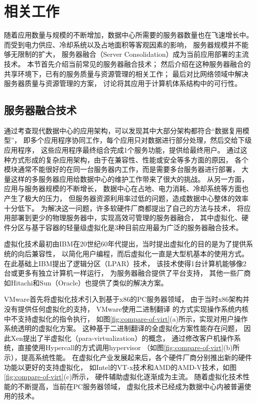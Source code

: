 

\chapter{相关工作}
\label{chap:background}

随着应用数量与规模的不断增加，数据中心所需要的服务器数量也在飞速增长中。
而受到电力供应、冷却系统以及占地面积等客观因素的影响，
服务器规模并不能够无限制的扩大，
服务器融合（Server Consolidation）成为当前应用部署的主流技术。
本节首先介绍当前常见的服务器融合技术；%
然后介绍在这种服务器融合的共享环境下，已有的服务质量与资源管理的相关工作；
最后对比网络领域中解决服务器质量与资源管理的方案，
讨论将其应用于计算机体系结构中的可行性。

\section{服务器融合技术}

通过考查现代数据中心的应用架构，可以发现其中大部分架构都符合``数据复用模型''，
即多个应用程序协同工作，每个应用只对数据进行部分处理，然后交给下级应用程序，
这些应用程序最终组合完成1个服务功能，提供给最终用户。
通过这种方式形成的复杂应用架构，由于在兼容性、性能或安全等多方面的原因，
各个模块通常不能很好的在同一台服务器内工作，而是需要多台服务器进行部署，
大量这样的多服务器应用给数据中心的维护工作带来了很大的挑战。
从另一方面，应用与服务器规模的不断增长，
数据中心在占地、电力消耗、冷却系统等方面也产生了极大的压力，
但服务器资源利用率过低的问题，造成数据中心整体的效率十分低下。
为解决这一问题，许多软硬件厂商都提出了自己的方法与技术，
将应用部署到更少的物理服务器中，实现高效可管理的服务器融合，
其中虚拟化、硬件分区与基于容器的轻量级虚拟化是3种目前应用最为广泛的服务器融合技术。

虚拟化技术最初由IBM在20世纪60年代提出，当时提出虚拟化的目的是为了提供系统的向后兼容性，
以简化用户编程，而后虚拟化一直是大型机基本的使用方式。
在此基础上IBM提出了逻辑分区（LPAR）\cite{IBM_LPAR:2007}技术，
该技术使得1台计算机能够像2台或更多有独立计算机一样运行，
为服务器融合提供了平台支持，
其他一些厂商如Hitachi\cite{hitachi-lpar}和Sun（Oracle）\cite{LDom}也提供了类似的解决方案。

VMware首先将虚拟化技术引入到基于x86的PC服务器领域，
由于当时x86架构并没有提供任何虚拟化的支持，
VMware使用二进制翻译\cite{vmware-compare-hw-sw:2006}
的方式实现操作系统内核中不支持虚拟化的指令执行，
如图\ref{fig:compare-of-virt}(a)所示，实现对用户操作系统透明的虚拟化方案。
这种基于二进制翻译的全虚拟化方案性能存在问题，
因此Xen提出了半虚拟化（para-virtualization）\cite{barham_xen_2003}的概念，
通过修改客户机操作系统，直接使用Hypercall的方式调用hypervisor
（如图\ref{fig:compare-of-virt}(b)所示），提高系统性能。
在虚拟化产业发展起来后，各个硬件厂商分别推出新的硬件功能以更好的支持虚拟化，
如Intel的VT-x技术和AMD的AMD-V技术，如图\ref{fig:compare-of-virt}(c)所示，
硬件辅助虚拟化逐渐成为主流。
随着虚拟化技术性能的不断提高，当前在PC服务器领域，
虚拟化技术已经成为数据中心内被普遍使用的技术。


